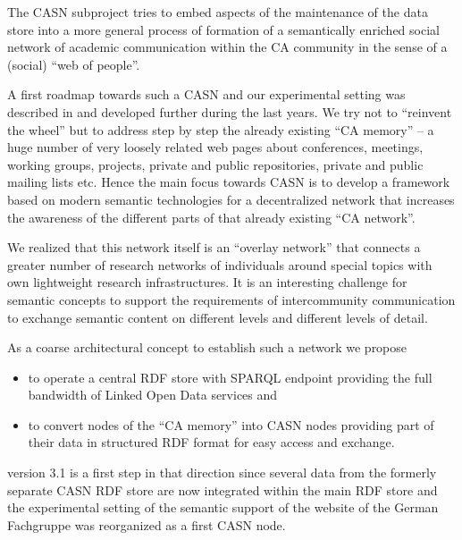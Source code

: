 \documentclass[11pt]{article}
\begin{document}
The CASN subproject tries to embed aspects of the maintenance of the {\SD}
data store into a more general process of formation of a semantically enriched
social network of academic communication within the CA community in the sense
of a (social) ``web of people''.

A first roadmap towards such a CASN and our experimental setting was described
in \cite{cicm-14} and developed further during the last years.  We try not to
``reinvent the wheel'' but to address step by step the already existing ``CA
memory'' -- a huge number of very loosely related web pages about conferences,
meetings, working groups, projects, private and public repositories, private
and public mailing lists etc. Hence the main focus towards CASN is to develop a
framework based on modern semantic technologies for a decentralized network
that increases the awareness of the different parts of that already existing
``CA network''.

We realized that this network itself is an ``overlay network'' that connects a
greater number of research networks of individuals around special topics with
own lightweight research infrastructures.  It is an interesting challenge for
semantic concepts to support the requirements of intercommunity communication
to exchange semantic content on different levels and different levels of
detail.

As a coarse architectural concept to establish such a network we propose
\begin{itemize}
\item to operate a central RDF store with SPARQL endpoint providing the full
  bandwidth of Linked Open Data services and
\item to convert nodes of the ``CA memory'' into CASN nodes providing part of
  their data in structured RDF format for easy access and exchange.
\end{itemize}
{\SD} version 3.1 is a first step in that direction since several data from the
formerly separate CASN RDF store are now integrated within the {\SD} main RDF
store and the experimental setting of the semantic support of the website of
the German Fachgruppe \cite{cafg} was reorganized as a first CASN node.
\end{document}
